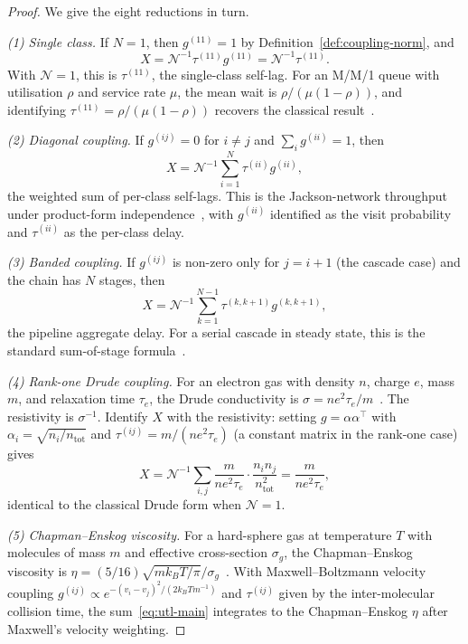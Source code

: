 \documentclass[twocolumn,11pt,a4paper]{article}
\newcommand{\TP}{X}
\newcommand{\Norm}{\mathcal{N}}
\newcommand{\lag}{\tau}
\newcommand{\cpl}{g}
\newcommand{\classcount}{N}
\begin{document}
\begin{proof}
We give the eight reductions in turn.

\emph{(1) Single class.} If $\classcount = 1$, then $\cpl^{(11)} = 1$ by Definition~\ref{def:coupling-norm}, and
\[
\TP = \Norm^{-1} \lag^{(11)} \cpl^{(11)} = \Norm^{-1} \lag^{(11)}.
\]
With $\Norm = 1$, this is $\lag^{(11)}$, the single-class self-lag. For an M/M/1 queue with utilisation $\rho$ and service rate $\mu$, the mean wait is $\rho / (\mu (1 - \rho))$, and identifying $\lag^{(11)} = \rho / (\mu (1 - \rho))$ recovers the classical result~\citep{kleinrock1975}.

\emph{(2) Diagonal coupling.} If $\cpl^{(ij)} = 0$ for $i \neq j$ and $\sum_i \cpl^{(ii)} = 1$, then
\[
\TP = \Norm^{-1} \sum_{i=1}^\classcount \lag^{(ii)} \cpl^{(ii)},
\]
the weighted sum of per-class self-lags. This is the Jackson-network throughput under product-form independence~\citep{jackson1957,baskett1975}, with $\cpl^{(ii)}$ identified as the visit probability and $\lag^{(ii)}$ as the per-class delay.

\emph{(3) Banded coupling.} If $\cpl^{(ij)}$ is non-zero only for $j = i + 1$ (the cascade case) and the chain has $\classcount$ stages, then
\[
\TP = \Norm^{-1} \sum_{k=1}^{\classcount - 1} \lag^{(k, k+1)} \cpl^{(k, k+1)},
\]
the pipeline aggregate delay. For a serial cascade in steady state, this is the standard sum-of-stage formula~\citep{kleinrock1975}.

\emph{(4) Rank-one Drude coupling.} For an electron gas with density $n$, charge $e$, mass $m$, and relaxation time $\tau_e$, the Drude conductivity is $\sigma = n e^2 \tau_e / m$~\citep{drude1900,sommerfeld1928,ashcroft1976}. The resistivity is $\sigma^{-1}$. Identify $\TP$ with the resistivity: setting $\cpl = \alpha \alpha^\top$ with $\alpha_i = \sqrt{n_i / n_\mathrm{tot}}$ and $\lag^{(ij)} = m / (n e^2 \tau_e)$ (a constant matrix in the rank-one case) gives
\[
\TP = \Norm^{-1} \sum_{i,j} \frac{m}{n e^2 \tau_e} \cdot \frac{n_i n_j}{n_\mathrm{tot}^2} = \frac{m}{n e^2 \tau_e},
\]
identical to the classical Drude form when $\Norm = 1$.

\emph{(5) Chapman--Enskog viscosity.} For a hard-sphere gas at temperature $T$ with molecules of mass $m$ and effective cross-section $\sigma_g$, the Chapman--Enskog viscosity is $\eta = (5/16)\sqrt{m k_B T / \pi} / \sigma_g$~\citep{chapman1970,maxwell1867}. With Maxwell--Boltzmann velocity coupling $\cpl^{(ij)} \propto e^{-(v_i - v_j)^2 / (2 k_B T m^{-1})}$ and $\lag^{(ij)}$ given by the inter-molecular collision time, the sum~\eqref{eq:utl-main} integrates to the Chapman--Enskog $\eta$ after Maxwell's velocity weighting.


\end{proof}
\end{document}

